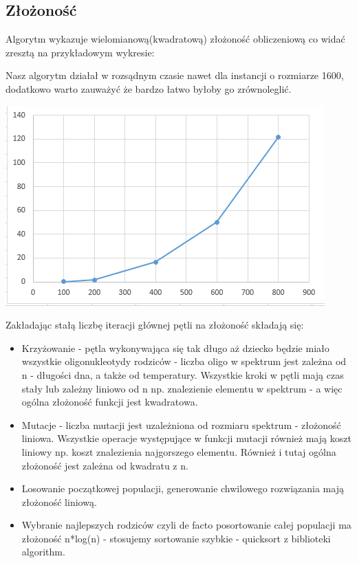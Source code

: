 \documentclass{article}
\begin{document}
\subsection{Złożoność}
Algorytm wykazuje wielomianową(kwadratową) złożoność obliczeniową co
widać zresztą na przykładowym wykresie:

Nasz algorytm działał w rozsądnym czasie nawet dla instancji o rozmiarze 1600, dodatkowo warto zauważyć że bardzo łatwo byłoby go zrównoleglić.

\includegraphics{genetic}

Zakładając stałą liczbę iteracji głównej pętli na złożoność składają się:

\begin{itemize}
\item Krzyżowanie - pętla wykonywająca się tak długo aż dziecko będzie miało wszystkie oligonukleotydy rodziców - liczba oligo w spektrum jest zależna od n - długości dna, a także od temperatury. Wszystkie kroki w pętli mają czas stały lub zależny liniowo od n np. znalezienie elementu w spektrum - a więc ogólna złożoność funkcji jest kwadratowa.

\item Mutacje - liczba mutacji jest uzależniona od rozmiaru spektrum - złożoność liniowa. Wszystkie operacje występujące w funkcji mutacji również
mają koszt liniowy np. koszt znalezienia najgorszego elementu. Również i tutaj ogólna złożoność jest zależna od kwadratu z n.
           
\item Losowanie początkowej populacji, generowanie chwilowego rozwiązania mają złożoność liniową.

\item Wybranie najlepszych rodziców czyli de facto posortowanie całej populacji ma złożoność n*log(n) - stosujemy sortowanie szybkie - quicksort z biblioteki algorithm.
\end{itemize}
\end{document}
